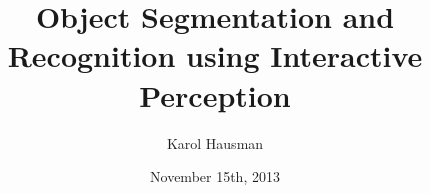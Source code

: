 \newcommand{\thedoctype}{Master's Thesis in Robotics, Cognition and Intelligence\xspace}
\newcommand{\thetitle}{Object Segmentation and Recognition using Interactive Perception\xspace}
\newcommand{\thetitleGer}{Objektsegmentierung und -erkennung mittels interaktiver Wahrnehmung\xspace}
\newcommand{\theauthor}{Karol Hausman\xspace}
\newcommand{\theplace}{Los Angeles\xspace}
\newcommand{\thedate}{November 15th, 2013\xspace}
\newcommand{\thesupervisor}{Prof. Dr. Daniel Cremers}
\newcommand{\thesecsupervisor}{, Dr. J{\"u}rgen Sturm}
\newcommand{\theadvisor}{Dejan Pangercic}

\date{\thedate}
\title{\thetitle}
\author{\theauthor}

\newcommand{\footertext}{}
